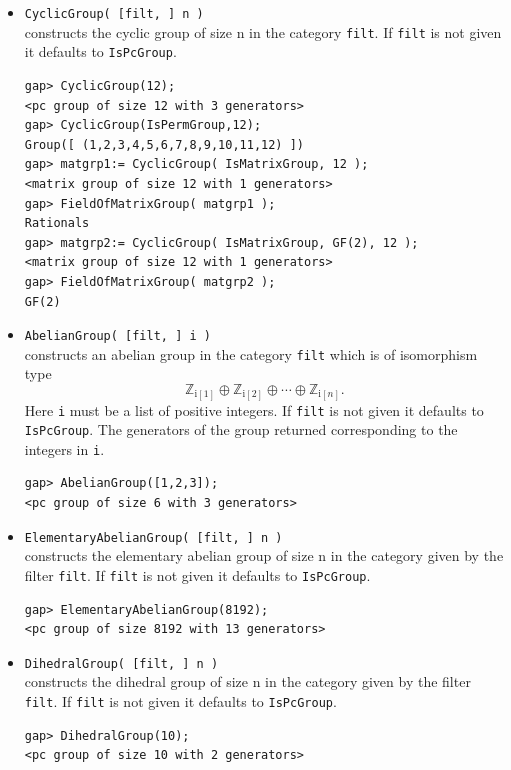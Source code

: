 \documentclass[11pt]{amsart}
\theoremstyle{plain}
\newcommand{\codesize}{\footnotesize}
\newcommand{\<}{\ensuremath{\langle}}
\renewcommand{\>}{\ensuremath{\rangle}}
\newcommand{\Z}{\ensuremath{\mathbb{Z}}}
\begin{document}
\begin{itemize}
\item {\tt CyclicGroup( [filt, ] n )}\\[2pt] 
constructs the cyclic group of size n in the category {\tt filt}. 
If {\tt filt} is not given it defaults to {\tt IsPcGroup}.
{\codesize
\begin{verbatim}
gap> CyclicGroup(12);
<pc group of size 12 with 3 generators>
gap> CyclicGroup(IsPermGroup,12);
Group([ (1,2,3,4,5,6,7,8,9,10,11,12) ])
gap> matgrp1:= CyclicGroup( IsMatrixGroup, 12 );
<matrix group of size 12 with 1 generators>
gap> FieldOfMatrixGroup( matgrp1 );
Rationals
gap> matgrp2:= CyclicGroup( IsMatrixGroup, GF(2), 12 );
<matrix group of size 12 with 1 generators>
gap> FieldOfMatrixGroup( matgrp2 );
GF(2)
\end{verbatim}}
\item {\tt AbelianGroup( [filt, ] i )}\\[2pt] 
constructs an abelian group in the category {\tt filt} which is
of isomorphism type 
\[
\Z_{\mbox{i}[1]} \oplus \Z_{\mbox{i}[2]} \oplus \cdots \oplus \Z_{\mbox{i}[n]}.
\]
Here {\tt i} must be a list of positive integers. If {\tt filt} is not given it
defaults to {\tt IsPcGroup}. 
The generators of the group returned corresponding to the integers in {\tt i}.  %
{\codesize
\begin{verbatim}
gap> AbelianGroup([1,2,3]);
<pc group of size 6 with 3 generators>
\end{verbatim}}
\item {\tt ElementaryAbelianGroup( [filt, ] n )}\\[2pt] 
constructs the elementary abelian group of size n in the category given by the filter
{\tt filt}. If {\tt filt} is not given it defaults to {\tt IsPcGroup}.
{\codesize
\begin{verbatim}
gap> ElementaryAbelianGroup(8192);
<pc group of size 8192 with 13 generators>
\end{verbatim}}
\item {\tt DihedralGroup( [filt, ] n )}\\[2pt] 
constructs the dihedral group of size n in the category given by the filter
{\tt filt}. If {\tt filt} is not given it defaults to {\tt IsPcGroup}.
{\codesize
\begin{verbatim}
gap> DihedralGroup(10);
<pc group of size 10 with 2 generators>
\end{verbatim}}

\end{itemize}
\end{document}
